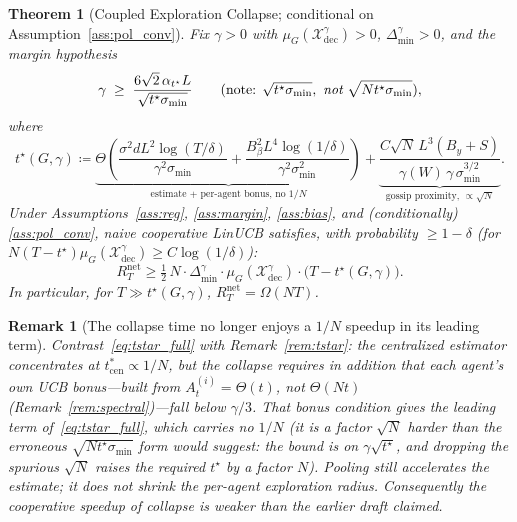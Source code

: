 \documentclass[11pt]{article}
\newtheorem{theorem}{Theorem}[section]
\newtheorem*{remark}{Remark}
\begin{document}
\begin{theorem}[Coupled Exploration Collapse; conditional on
Assumption~\ref{ass:pol_conv}]\label{thm:cec}
Fix $\gamma>0$ with $\mu_G(\mathcal{X}_{\mathrm{dec}}^\gamma)>0$,
$\Delta_{\min}^\gamma>0$, and the \emph{margin hypothesis}
\begin{equation}
\gamma\;\geq\;\frac{6\sqrt{2}\,\alpha_{t^\star}L}{\sqrt{t^\star\sigma_{\min}}}
\qquad(\text{note: }\sqrt{t^\star\sigma_{\min}},\ \emph{not}\ \sqrt{Nt^\star\sigma_{\min}}),
\label{eq:margin_hyp}
\end{equation}
where
\begin{equation}
t^\star(G,\gamma)\coloneqq
\underbrace{\Theta\!\left(
\frac{\sigma^2 dL^2\log(T/\delta)}{\gamma^2\sigma_{\min}}
+\frac{B_\beta^2 L^4\log(1/\delta)}{\gamma^2\sigma_{\min}^2}\right)}_{\text{estimate + per-agent bonus, no }1/N}
+\underbrace{\frac{C\sqrt{N}\,L^3(B_y+S)}{\gamma(W)\,\gamma\,\sigma_{\min}^{3/2}}}_{\text{gossip proximity, }\propto\sqrt N}.
\label{eq:tstar_full}
\end{equation}
Under Assumptions~\ref{ass:reg}, \ref{ass:margin}, \ref{ass:bias},
and (conditionally) \ref{ass:pol_conv}, naive cooperative LinUCB
satisfies, with probability $\geq 1-\delta$ (for
$N(T-t^\star)\mu_G(\mathcal{X}_{\mathrm{dec}}^\gamma)\geq C\log(1/\delta)$):
\begin{equation}
R_T^{\mathrm{net}}\geq
\tfrac12\,N\cdot\Delta_{\min}^\gamma\cdot\mu_G(\mathcal{X}_{\mathrm{dec}}^\gamma)
\cdot\bigl(T-t^\star(G,\gamma)\bigr).
\label{eq:cec_bound}
\end{equation}
In particular, for $T\gg t^\star(G,\gamma)$,
$R_T^{\mathrm{net}}=\Omega(NT)$.
\end{theorem}

\begin{remark}[The collapse time no longer enjoys a $1/N$ speedup in
its leading term]\label{rem:noN}
Contrast~\eqref{eq:tstar_full} with Remark~\ref{rem:tstar}: the
\emph{centralized estimator} concentrates at $t_{\mathrm{cen}}^*\propto
1/N$, but the \emph{collapse} requires in addition that each agent's
own UCB bonus---built from $A_t^{(i)}=\Theta(t)$, \emph{not}
$\Theta(Nt)$ (Remark~\ref{rem:spectral})---fall below $\gamma/3$.
That bonus condition gives the leading term of~\eqref{eq:tstar_full},
which carries \emph{no} $1/N$ (it is a factor $\sqrt N$ harder than the
erroneous $\sqrt{Nt^\star\sigma_{\min}}$ form would suggest: the bound is
on $\gamma\sqrt{t^\star}$, and dropping the spurious $\sqrt N$ raises the
required $t^\star$ by a factor $N$).  Pooling still accelerates the
\emph{estimate}; it does not shrink the per-agent exploration radius.
Consequently the cooperative speedup of collapse is weaker than the
earlier draft claimed.
\end{remark}
\end{document}
